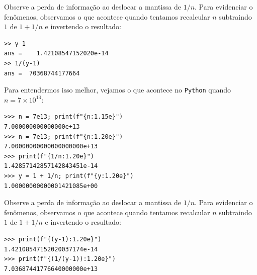 \begin{ex}
\begin{verbatim}
\end{verbatim}
Observe a perda de informação ao deslocar a mantissa de $1/n$. Para evidenciar o fenômenos, observamos o que acontece quando tentamos recalcular $n$ subtraindo $1$ de $1+1/n$ e invertendo o resultado:
\begin{verbatim}
>> y-1
ans =    1.42108547152020e-14
>> 1/(y-1)
ans =  70368744177664
\end{verbatim}
\fi
\ifispython
Para entendermos isso melhor, vejamos o que acontece no \verb+Python+ quando $n=7\times 10^{13}$:
\begin{verbatim}
>>> n = 7e13; print(f"{n:1.15e}")
7.000000000000000e+13
>>> n = 7e13; print(f"{n:1.20e}")
7.00000000000000000000e+13
>>> print(f"{1/n:1.20e}")
1.42857142857142843451e-14
>>> y = 1 + 1/n; print(f"{y:1.20e}")
1.00000000000001421085e+00
\end{verbatim}
Observe a perda de informação ao deslocar a mantissa de $1/n$. Para evidenciar o fenômenos, observamos o que acontece quando tentamos recalcular $n$ subtraindo $1$ de $1+1/n$ e invertendo o resultado:
\begin{verbatim}
>>> print(f"{(y-1):1.20e}")
1.42108547152020037174e-14
>>> print(f"{(1/(y-1)):1.20e}")
7.03687441776640000000e+13
\end{verbatim}
\fi
\end{ex}

